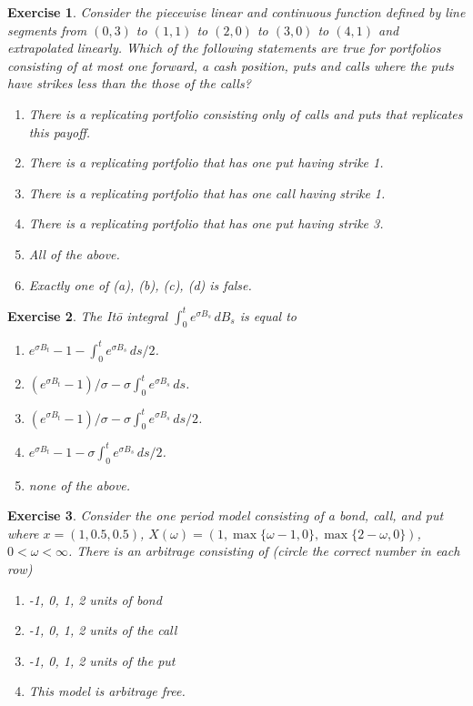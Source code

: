 \documentclass[11pt,fleqn]{amsproc}
\newtheorem{xca}{Exercise}
\begin{document}
\begin{xca}
Consider the piecewise linear and continuous function defined by line
segments from $(0,3)$ to $(1,1)$ to $(2,0)$ to $(3,0)$ to $(4,1)$ and
extrapolated linearly. Which of the following statements are true for
portfolios consisting of at most one forward, a cash position, puts and
calls where the puts have strikes less than the those of the calls?

\begin{enumerate}
\item There is a replicating portfolio consisting only of calls and puts that
replicates this payoff.
\item There is a replicating portfolio that has one put having strike 1.
\item There is a replicating portfolio that has one call having strike 1.
\item There is a replicating portfolio that has one put having strike 3.
\item All of the above.
\item Exactly one of (a), (b), (c), (d) is false.
\end{enumerate}
\end{xca}

\begin{xca}
The It\=o integral $\int_0^t e^{\sigma B_s}\,dB_s$ is equal to
\begin{enumerate}
\item $e^{\sigma B_t} - 1 - \int_0^t e^{\sigma B_s}\,ds/2$.
\item $(e^{\sigma B_t} - 1)/\sigma - \sigma\int_0^t e^{\sigma B_s}\,ds$.
\item $(e^{\sigma B_t} - 1)/\sigma - \sigma\int_0^t e^{\sigma B_s}\,ds/2$.
\item $e^{\sigma B_t} - 1 - \sigma\int_0^t e^{\sigma B_s}\,ds/2$.
\item none of the above.
\end{enumerate}
\end{xca}

\begin{xca}
Consider the one period model consisting of a bond, call,
and put where $x = (1, 0.5, 0.5)$,
$X(\omega) = (1, \max\{\omega - 1, 0\}, \max\{2 - \omega, 0\})$,
$0 < \omega < \infty$.
There is an arbitrage consisting of (circle the correct number
in each row)
\begin{enumerate}
\item -1, 0, 1, 2 units of bond
\item -1, 0, 1, 2 units of the call
\item -1, 0, 1, 2 units of the put
\item This model is arbitrage free.
\end{enumerate}
\end{xca}
\end{document}
